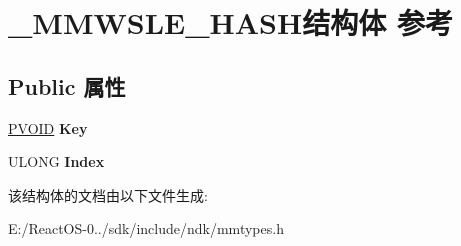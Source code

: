 \hypertarget{struct___m_m_w_s_l_e___h_a_s_h}{}\section{\+\_\+\+M\+M\+W\+S\+L\+E\+\_\+\+H\+A\+S\+H结构体 参考}
\label{struct___m_m_w_s_l_e___h_a_s_h}
\subsection*{Public 属性}
\begin{DoxyCompactItemize}
\item 
\mbox{\label{struct___m_m_w_s_l_e___h_a_s_h_a892b7997d3e0fd3fedcd389b951f5cda}} 
\hyperlink{interfacevoid}{P\+V\+O\+ID} {\bfseries Key}
\item 
\mbox{\label{struct___m_m_w_s_l_e___h_a_s_h_a34e4c8002becdfdda4932e2c778c135d}} 
U\+L\+O\+NG {\bfseries Index}
\end{DoxyCompactItemize}


该结构体的文档由以下文件生成\+:\begin{DoxyCompactItemize}
\item 
E\+:/\+React\+O\+S-\/0../sdk/include/ndk/mmtypes.\+h\end{DoxyCompactItemize}

